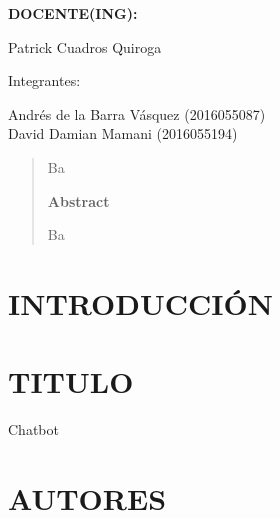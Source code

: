 \documentclass[12pt,letterpaper]{article}
\begin{document}
\begin{titlepage}
\begin{center}
\vspace*{0.3in}
\begin{Large}
\textbf{DOCENTE(ING):} \\
\end{Large}

\vspace*{0.1in}
\begin{large}
 Patrick Cuadros Quiroga\\
\end{large}

\vspace*{0.2in}
\vspace*{0.1in}
\begin{large}
Integrantes: \\
\begin{flushleft}

Andrés de la Barra Vásquez            	\hfill	(2016055087) \\
David Damian Mamani 			\hfill	(2016055194) \\

\end{flushleft}
\end{large}
\end{center}

\end{titlepage}


\tableofcontents %
\thispagestyle{empty} %
\newpage
\setcounter{page}{1} %

\begin{abstract}

Ba


\begin{center}
\textbf{Abstract}
\end{center}
Ba

\end{abstract}
\newpage
\section{INTRODUCCIÓN} 



\newpage
\section{TITULO}
	\par Chatbot
\section{AUTORES}
\end{document}

